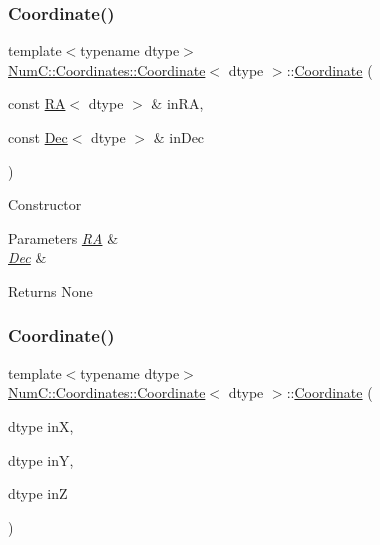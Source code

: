 \subsubsection{\texorpdfstring{Coordinate()}{Coordinate()}\hspace{0.1cm}{\footnotesize\ttfamily [4/6]}}
{\footnotesize\ttfamily template$<$typename dtype$>$ \\
\mbox{\hyperlink{class_num_c_1_1_coordinates_1_1_coordinate}{Num\+C\+::\+Coordinates\+::\+Coordinate}}$<$ dtype $>$\+::\mbox{\hyperlink{class_num_c_1_1_coordinates_1_1_coordinate}{Coordinate}} (\begin{DoxyParamCaption}\item[{const \mbox{\hyperlink{class_num_c_1_1_coordinates_1_1_r_a}{RA}}$<$ dtype $>$ \&}]{in\+RA,  }\item[{const \mbox{\hyperlink{class_num_c_1_1_coordinates_1_1_dec}{Dec}}$<$ dtype $>$ \&}]{in\+Dec }\end{DoxyParamCaption})\hspace{0.3cm}{\ttfamily [inline]}}

Constructor


\begin{DoxyParams}{Parameters}
{\em \mbox{\hyperlink{class_num_c_1_1_coordinates_1_1_r_a}{RA}}} & \\
\hline
{\em \mbox{\hyperlink{class_num_c_1_1_coordinates_1_1_dec}{Dec}}} & \\
\hline
\end{DoxyParams}
\begin{DoxyReturn}{Returns}
None 
\end{DoxyReturn}
\mbox{\label{class_num_c_1_1_coordinates_1_1_coordinate_a5d53ed06a21ccce8c3851c36c1e5467e}} 
\subsubsection{\texorpdfstring{Coordinate()}{Coordinate()}\hspace{0.1cm}{\footnotesize\ttfamily [5/6]}}
{\footnotesize\ttfamily template$<$typename dtype$>$ \\
\mbox{\hyperlink{class_num_c_1_1_coordinates_1_1_coordinate}{Num\+C\+::\+Coordinates\+::\+Coordinate}}$<$ dtype $>$\+::\mbox{\hyperlink{class_num_c_1_1_coordinates_1_1_coordinate}{Coordinate}} (\begin{DoxyParamCaption}\item[{dtype}]{inX,  }\item[{dtype}]{inY,  }\item[{dtype}]{inZ }\end{DoxyParamCaption})\hspace{0.3cm}{\ttfamily [inline]}}

